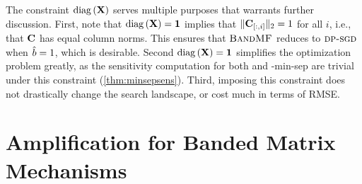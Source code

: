 \documentclass{article}
\begin{document}
%
The constraint $\operatorname{diag}{(\mathbf{X})}$ serves multiple purposes that warrants further discussion.  First, note that $\operatorname{diag}{(\mathbf{X})} = \bf1$ implies that $ \| \mathbf{C}_{[:,i]} \|_2 = 1$ for all $i$, i.e., that $\mathbf{C}$ has equal column norms.  This ensures that $\textsc{BandMF}$ reduces to $\textsc{dp-sgd}$ when $\hat{b}=1$, which is desirable.  Second $\operatorname{diag}{(\mathbf{X})} = \bf1$ simplifies the optimization problem greatly, as the sensitivity computation for both \multiepochpart and \minsep-min-sep are trivial under this constraint (\cref{thm:minsepsens}).  Third, imposing this constraint does not drastically change the search landscape, or cost much in terms of RMSE.  %


\section{Amplification for Banded Matrix Mechanisms}\label{sec:amplification}

\newcommand{\usersperband}{\check{m}}
\newcommand{\amaxpart}{\maxpart}  %
\end{document}
